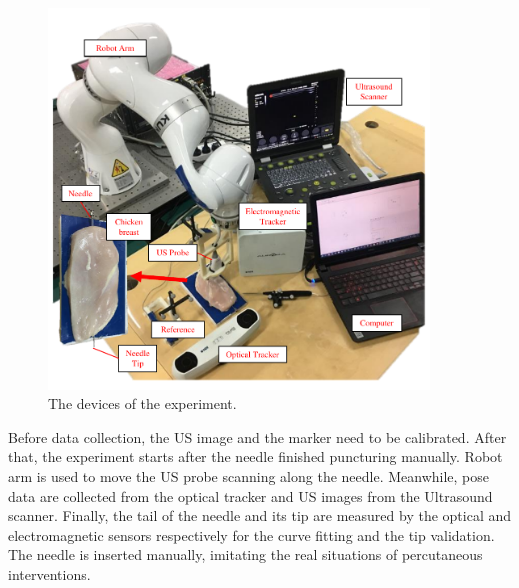 \documentclass[journal,article,submit,moreauthors,pdftex]{Definitions/mdpi}
\begin{document}
\begin{figure}[H]
	\centering
	\includegraphics[width=0.9\textwidth]{figures/2/f6.pdf}
	\captionsetup{width=16 cm,justification=centering}
	\caption{The devices of the experiment.}
	\label{fig:6}
\end{figure}

Before data collection, the US image and the marker need to be calibrated. After that, the experiment starts after the needle finished puncturing manually. Robot arm is used to move the US probe scanning along the needle. Meanwhile, pose data are collected from the optical tracker and US images from the Ultrasound scanner. Finally, the tail of the needle and its tip are measured by the optical and electromagnetic sensors respectively for the curve fitting and the tip validation. The needle is inserted manually, imitating the real situations of percutaneous interventions.
\end{document}

